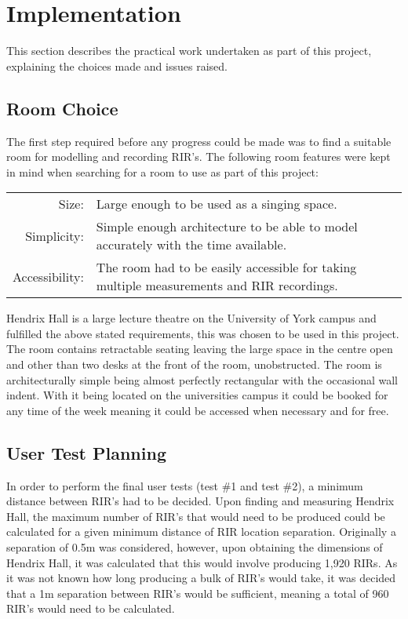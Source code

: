 \documentclass[../../main.tex]{subfiles}
\begin{document}
	\section{Implementation}
		This section describes the practical work undertaken as part of this project, explaining the choices made and issues raised.

	\subsection{Room Choice}
	\label{roomChoice}

		The first step required before any progress could be made was to find a suitable room for modelling and recording \ac{RIR}'s. The following room features were kept in mind when searching for a room to use as part of this project:
		\begin{center}
		\begin{tabular}{r p{12cm}}
			Size: & Large enough to be used as a singing space. \\
			Simplicity: & Simple enough architecture to be able to model accurately with the time available. \\
			Accessibility: & The room had to be easily accessible for taking multiple measurements and \ac{RIR} recordings.
		\end{tabular}
		\end{center}

		\vspace{5mm}

		Hendrix Hall is a large lecture theatre on the University of York campus and fulfilled the above stated requirements, this was chosen to be used in this project. The room contains retractable seating leaving the large space in the centre open and other than two desks at the front of the room, unobstructed. The room is architecturally simple being almost perfectly rectangular with the occasional wall indent. With it being located on the universities campus it could be booked for any time of the week meaning it could be accessed when necessary and for free.

	\subsection{User Test Planning}
	\label{Background:RIRPositions}

		In order to perform the final user tests (test \#1 and test \#2), a minimum distance between \ac{RIR}'s had to be decided. Upon finding and measuring Hendrix Hall, the maximum number of \ac{RIR}'s that would need to be produced could be calculated for a given minimum distance of \ac{RIR} location separation. Originally a separation of 0.5m was considered, however, upon obtaining the dimensions of Hendrix Hall, it was calculated that this would involve producing 1,920 \ac{RIR}s. As it was not known how long producing a bulk of \ac{RIR}'s would take, it was decided that a 1m separation between \ac{RIR}'s would be sufficient, meaning a total of 960 \ac{RIR}'s would need to be calculated.
\end{document}
